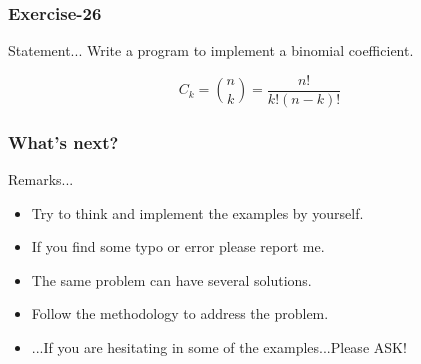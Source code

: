 \documentclass[xcolor=dvipsnames,dvip,notes=show,table]{beamer}
\begin{document}
\begin{frame}[fragile]
\frametitle{Exercise-26}
\begin{block}{Statement...}
Write a program to implement a binomial coefficient.
\end{block}
% 

\begin{equation}
C_{k} = \binom{n}{k} = \frac{n!}{k!(n-k)!} 
\end{equation}

\end{frame}



\begin{frame}[fragile]
\frametitle{What's next?}
\begin{exampleblock}{Remarks...}
\begin{itemize}
 \item Try to think and implement the examples by yourself.
 \item If you find some typo or error please report me.
 \item The same problem can have several solutions.
 \item Follow the methodology to address the problem.
 \item ...If you are hesitating in some of the examples...Please ASK!
\end{itemize}

\end{exampleblock}



\end{frame}

% 
\frame{
\titlepage

}


\end{document}

